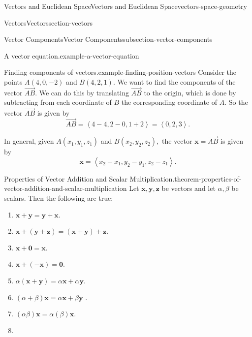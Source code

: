 \documentclass[oneside,10pt,]{book}
\numberwithin{equation}{section}
\newcommand{\vv}[1]{\mathbf{#1}}
\newcommand{\dotprod}[1]{\left\langle #1 \right\rangle}
\begin{document}
\begin{chapterptx}{Vectors and Euclidean Space}{}{Vectors and Euclidean Space}{}{}{vectors-space-geometry}
\begin{sectionptx}{Vectors}{}{Vectors}{}{}{section-vectors}
\begin{subsectionptx}{Vector Components}{}{Vector Components}{}{}{subsection-vector-components}
\begin{example}{A vector equation.}{example-a-vector-equation}
\end{example}
\begin{example}{Finding components of vectors.}{example-finding-position-vectors}%
\hypertarget{p-1096}{}%
Consider the points \(A(4,0,-2)\) and \(B(4,2,1)\). We want to find the components of the vector \(\overrightarrow{AB}\). We can do this by translating \(\overrightarrow{AB}\) to the origin, which is done by subtracting from each coordinate of \(B\) the corresponding coordinate of \(A\). So the vector \(\overrightarrow{AB}\) is given by%
%
\begin{equation*}
\overrightarrow{AB} = \dotprod{4-4,2-0,1+2} = \dotprod{0,2,3}.
\end{equation*}
\end{example}
\hypertarget{p-1097}{}%
In general, given \(A(x_{1},y_{1},z_{1})\) and \(B(x_{2},y_{2},z_{2}),\) the vector \(\vv{x} = \overrightarrow{AB}\) is given by%
%
\begin{equation*}
\vv{x} = \dotprod{x_{2}-x_{1},y_{2}-y_{1},z_{2}-z_{1}}.
\end{equation*}
\begin{theorem}{Properties of Vector Addition and Scalar Multiplication.}{}{theorem-properties-of-vector-addition-and-scalar-multiplication}%
\hypertarget{p-1098}{}%
Let \(\vv{x},\vv{y},\vv{z}\) be vectors and let \(\alpha,\beta\) be scalars. Then the following are true:%
\leavevmode%
\begin{multicols}{2}
\begin{enumerate}
\item\hypertarget{li-110}{}\hypertarget{p-1099}{}%
\(\vv{x}+\vv{y} = \vv{y}+\vv{x}\).%
\item\hypertarget{li-111}{}\hypertarget{p-1100}{}%
\(\vv{x}+(\vv{y}+\vv{z}) = (\vv{x}+\vv{y})+\vv{z}.\)%
\item\hypertarget{li-112}{}\hypertarget{p-1101}{}%
\(\vv{x}+\vv{0} = \vv{x}.\)%
\item\hypertarget{li-113}{}\hypertarget{p-1102}{}%
\(\vv{x}+(-\vv{x}) = \vv{0}.\)%
\item\hypertarget{li-114}{}\hypertarget{p-1103}{}%
\(\alpha(\vv{x}+\vv{y}) = \alpha\vv{x}+\alpha\vv{y}.\)%
\item\hypertarget{li-115}{}\hypertarget{p-1104}{}%
\((\alpha+\beta)\vv{x} = \alpha\vv{x}+\beta\vv{y}\)%
. \item\hypertarget{li-116}{}\hypertarget{p-1105}{}%
\((\alpha\beta)\vv{x} = \alpha(\beta)\vv{x}.\)%
\item\hypertarget{li-117}{}\hypertarget{p-1106}{}%

\end{enumerate}
\end{multicols}
\end{theorem}
\end{subsectionptx}
\end{sectionptx}
\end{chapterptx}
\end{document}
